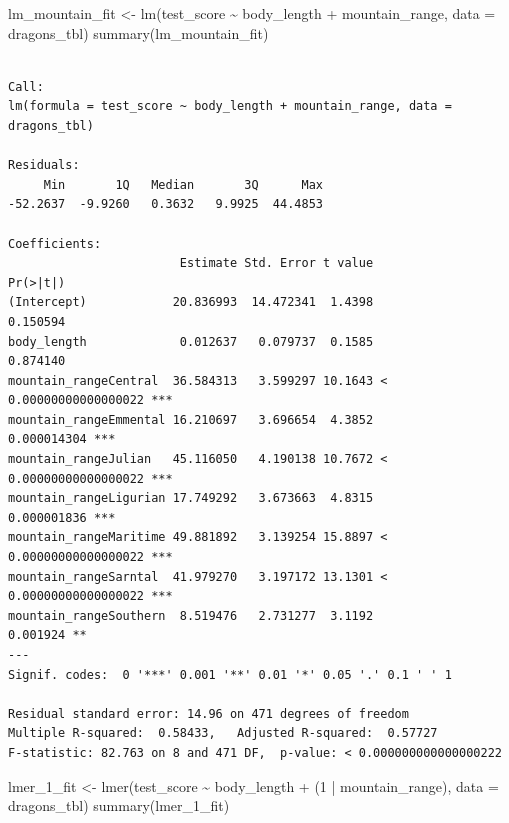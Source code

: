 \documentclass[
  letterpaper,
]{scrbook}
\newenvironment{Shaded}{\begin{snugshade}}{\end{snugshade}}
\newcommand{\AttributeTok}[1]{\textcolor[rgb]{0.40,0.45,0.13}{#1}}
\newcommand{\DecValTok}[1]{\textcolor[rgb]{0.68,0.00,0.00}{#1}}
\newcommand{\FunctionTok}[1]{\textcolor[rgb]{0.28,0.35,0.67}{#1}}
\newcommand{\NormalTok}[1]{\textcolor[rgb]{0.00,0.23,0.31}{#1}}
\newcommand{\OtherTok}[1]{\textcolor[rgb]{0.00,0.23,0.31}{#1}}
\newcommand{\SpecialCharTok}[1]{\textcolor[rgb]{0.37,0.37,0.37}{#1}}
\begin{document}
\begin{Shaded}
\begin{Highlighting}[]
\NormalTok{lm\_mountain\_fit }\OtherTok{\textless{}{-}} \FunctionTok{lm}\NormalTok{(test\_score }\SpecialCharTok{\textasciitilde{}}\NormalTok{ body\_length }\SpecialCharTok{+}\NormalTok{ mountain\_range, }\AttributeTok{data =}\NormalTok{ dragons\_tbl)}
\FunctionTok{summary}\NormalTok{(lm\_mountain\_fit)}
\end{Highlighting}
\end{Shaded}

\begin{verbatim}

Call:
lm(formula = test_score ~ body_length + mountain_range, data = dragons_tbl)

Residuals:
     Min       1Q   Median       3Q      Max 
-52.2637  -9.9260   0.3632   9.9925  44.4853 

Coefficients:
                        Estimate Std. Error t value              Pr(>|t|)    
(Intercept)            20.836993  14.472341  1.4398              0.150594    
body_length             0.012637   0.079737  0.1585              0.874140    
mountain_rangeCentral  36.584313   3.599297 10.1643 < 0.00000000000000022 ***
mountain_rangeEmmental 16.210697   3.696654  4.3852           0.000014304 ***
mountain_rangeJulian   45.116050   4.190138 10.7672 < 0.00000000000000022 ***
mountain_rangeLigurian 17.749292   3.673663  4.8315           0.000001836 ***
mountain_rangeMaritime 49.881892   3.139254 15.8897 < 0.00000000000000022 ***
mountain_rangeSarntal  41.979270   3.197172 13.1301 < 0.00000000000000022 ***
mountain_rangeSouthern  8.519476   2.731277  3.1192              0.001924 ** 
---
Signif. codes:  0 '***' 0.001 '**' 0.01 '*' 0.05 '.' 0.1 ' ' 1

Residual standard error: 14.96 on 471 degrees of freedom
Multiple R-squared:  0.58433,   Adjusted R-squared:  0.57727 
F-statistic: 82.763 on 8 and 471 DF,  p-value: < 0.000000000000000222
\end{verbatim}

\begin{Shaded}
\begin{Highlighting}[]
\NormalTok{lmer\_1\_fit }\OtherTok{\textless{}{-}} \FunctionTok{lmer}\NormalTok{(test\_score }\SpecialCharTok{\textasciitilde{}}\NormalTok{ body\_length }\SpecialCharTok{+}\NormalTok{ (}\DecValTok{1} \SpecialCharTok{|}\NormalTok{ mountain\_range), }\AttributeTok{data =}\NormalTok{ dragons\_tbl)}
\FunctionTok{summary}\NormalTok{(lmer\_1\_fit)}
\end{Highlighting}
\end{Shaded}
\end{document}
